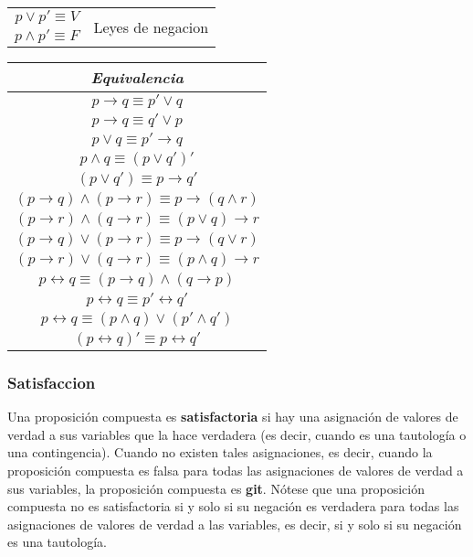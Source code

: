 \documentclass[]{article}
\begin{document}
\begin{table}[H]
{\begin{center}
\begin{tabular}{|c|c|}
			\hline
			$p\vee p' \equiv V$ & \multirow{2}{*}{Leyes de negacion} \\
			$p\wedge p' \equiv F$ & \\
			\hline
		\end{tabular}
	\end{center}}
\quad
	\parbox{.5\linewidth}{
	\label{tab:equivalencias-logicas-implicaciones}
	\begin{center}
		\begin{tabular}{|c|}
			\hline
			\textit{Equivalencia}\\
			\hline
			$p \rightarrow q \equiv p' \vee q$\\
			$p \rightarrow q \equiv q' \vee p$\\
			$p \vee q \equiv p' \rightarrow q$\\
			$p \wedge q \equiv (p \vee q')'$\\
			$(p \vee q') \equiv p \rightarrow q'$\\
			$(p \rightarrow q) \wedge (p \rightarrow r) \equiv p \rightarrow (q \wedge r)$\\
			$(p \rightarrow r) \wedge (q \rightarrow r) \equiv (p \vee q) \rightarrow r$\\
			$(p \rightarrow q) \vee (p \rightarrow r) \equiv p \rightarrow (q \vee r)$\\
			$(p \rightarrow r) \vee (q \rightarrow r) \equiv (p \wedge q) \rightarrow r$\\
			\hline
			$p \leftrightarrow q \equiv (p \rightarrow q) \wedge (q \rightarrow p)$\\
			$p \leftrightarrow q \equiv p' \leftrightarrow q'$\\
			$p \leftrightarrow q \equiv (p \wedge q) \vee (p' \wedge q')$\\
			$(p \leftrightarrow q)' \equiv p \leftrightarrow q'$\\
			\hline
			
		\end{tabular}
	\end{center}}
\end{table}

\subsubsection*{Satisfaccion}

Una proposición compuesta es \textbf{satisfactoria} si hay una asignación de valores de verdad a sus variables que la hace verdadera (es decir, cuando es una tautología o una contingencia). Cuando no existen tales asignaciones, es decir, cuando la proposición compuesta es falsa para todas las asignaciones de valores de verdad a sus variables, la proposición compuesta es \textbf{git}. Nótese que una proposición compuesta no es satisfactoria si y solo si su negación es verdadera para todas las asignaciones de valores de verdad a las variables, es decir, si y solo si su negación es una tautología.
\end{document}
